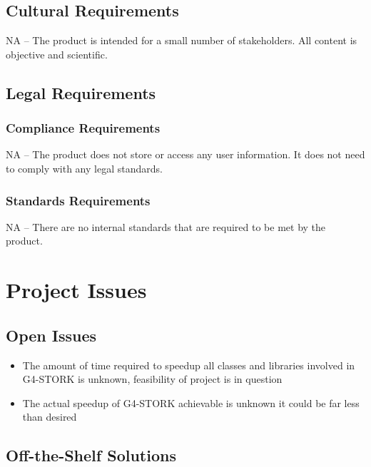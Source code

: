 \documentclass[12pt]{article}
\begin{document}
\subsection{Cultural Requirements} %
NA -- The product is intended for a small number of stakeholders. All content is objective and scientific.

\subsection{Legal Requirements} %
\subsubsection{Compliance Requirements}
NA -- The product does not store or access any user information. It does not need to comply with any legal standards.

\subsubsection{Standards Requirements}
NA -- There are no internal standards that are required to be met by the product.

\section{Project Issues}

\subsection{Open Issues} %
\begin{itemize}
\item The amount of time required to speedup all classes and libraries involved in G4-STORK is unknown, feasibility of project is in question
\item The actual speedup of G4-STORK achievable is unknown it could be far less than desired
\end{itemize}

\subsection{Off-the-Shelf Solutions} %
\end{document}
